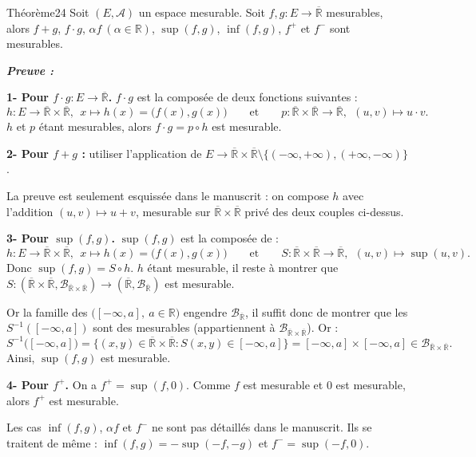 \documentclass[11pt,a4paper]{article}
\newcommand{\R}{\mathbb{R}}
\newcommand{\Rb}{\overline{\mathbb{R}}}
\newcommand{\A}{\mathscr{A}}
\newcommand{\B}{\mathscr{B}}
\newenvironment{preuve}{\par\textit{\textbf{Preuve :}}\par\nopagebreak[4]}{\par}
\begin{document}
\begin{enonce}{Théorème}{24}
Soit $(E,\A)$ un espace mesurable. Soit $f,g:E\to\Rb$ mesurables, alors
$f+g$, $f\cdot g$, $\alpha f\ (\alpha\in\R)$, $\sup(f,g)$, $\inf(f,g)$, $f^{+}$ et $f^{-}$ sont mesurables.
\end{enonce}

\begin{preuve}\end{preuve}

\textbf{1- Pour $f\cdot g : E\to\Rb$.} $f\cdot g$ est la composée de deux fonctions suivantes :
\[
  h:E\to\Rb\times\Rb,\ \ x\mapsto h(x)=\bigl(f(x),g(x)\bigr)
  \qquad\text{et}\qquad
  p:\Rb\times\Rb\to\Rb,\ \ (u,v)\mapsto u\cdot v .
\]
$h$ et $p$ étant mesurables, alors $f\cdot g=p\circ h$ est mesurable.

\textbf{2- Pour $f+g$ :} utiliser l'application de $E\to\Rb\times\Rb\setminus\{(-\infty,+\infty),(+\infty,-\infty)\}$.

\begin{note}
La preuve est seulement esquissée dans le manuscrit : on compose $h$ avec l'addition $(u,v)\mapsto u+v$,
mesurable sur $\Rb\times\Rb$ privé des deux couples ci-dessus.
\end{note}

\textbf{3- Pour $\sup(f,g)$.} $\sup(f,g)$ est la composée de :
\[
  h:E\to\Rb\times\Rb,\ \ x\mapsto h(x)=\bigl(f(x),g(x)\bigr)
  \qquad\text{et}\qquad
  S:\Rb\times\Rb\to\Rb,\ \ (u,v)\mapsto\sup(u,v).
\]
Donc $\sup(f,g)=S\circ h$. $h$ étant mesurable, il reste à montrer que
$S:(\Rb\times\Rb,\B_{\Rb\times\Rb})\to(\Rb,\B_{\Rb})$ est mesurable.

Or la famille des $\bigl([-\infty,a],\ a\in\R\bigr)$ engendre $\B_{\Rb}$, il suffit donc de montrer que
les $S^{-1}([-\infty,a])$ sont des mesurables (appartiennent à $\B_{\Rb\times\Rb}$). Or :
\[
  S^{-1}\bigl([-\infty,a]\bigr)=\bigl\{(x,y)\in\Rb\times\Rb : S(x,y)\in[-\infty,a]\bigr\}
  =[-\infty,a]\times[-\infty,a]\in\B_{\Rb\times\Rb}.
\]
Ainsi, $\sup(f,g)$ est mesurable.

\textbf{4- Pour $f^{+}$.} On a $f^{+}=\sup(f,0)$. Comme $f$ est mesurable et $0$ est mesurable,
alors $f^{+}$ est mesurable.

\begin{note}
Les cas $\inf(f,g)$, $\alpha f$ et $f^{-}$ ne sont pas détaillés dans le manuscrit.
Ils se traitent de même : $\inf(f,g)=-\sup(-f,-g)$ et $f^{-}=\sup(-f,0)$.
\end{note}
\end{document}
